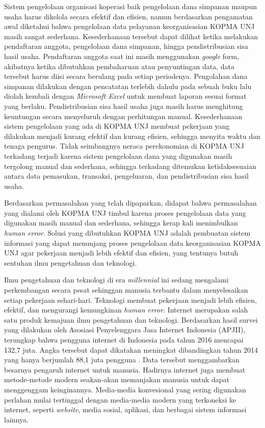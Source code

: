 Sistem pengelolaan organisasi koperasi baik pengelolaan dana simpanan maupun usaha harus dikelola secara efektif dan efisien, namun berdasarkan pengamatan awal diketahui bahwa pengelolaan data pelayanan keorganisasian KOPMA UNJ masih sangat sederhana. Kesederhanaan tersebut dapat dilihat ketika melakukan pendaftaran anggota, pengelolaan dana simpanan, hingga pendistribusian sisa hasil usaha. Pendaftaran anggota saat ini masih menggunakan \emph{google} form, akibatnya ketika dibutuhkan pembaharuan atau penyuntingan data, data tersebut harus diisi secara berulang pada setiap periodenya. Pengolahan dana simpanan dilakukan dengan pencatatan terlebih dahulu pada sebuah buku lalu diolah kembali dengan \emph{Microsoft Excel} untuk membuat laporan sesuai format yang berlaku. Pendistribusian sisa hasil usaha juga masih harus menghitung keuntungan secara menyeluruh dengan perhitungan manual. Kesederhanaan sistem pengelolaan yang ada di KOPMA UNJ membuat pekerjaan yang dilakukan menjadi kurang efektif dan kurang efisien, sehingga menyita waktu dan tenaga pengurus. Tidak seimbangnya neraca perekonomian di KOPMA UNJ terkadang terjadi karena sistem pengelolaan dana yang digunakan masih tergolong manual dan sederhana, sehingga terkadang ditemukan ketidaksesuaian antara data pemasukan, transaksi, pengeluaran, dan pendistribusian sisa hasil usaha. 

Berdasarkan permasalahan yang telah dipaparkan, didapat bahwa permasalahan yang dialami oleh KOPMA UNJ timbul karena proses pengelolaan data yang digunakan masih manual dan sederhana, sehingga kerap kali menimbulkan \emph{human error}. Solusi yang dibutuhkan KOPMA UNJ adalah pembuatan sistem informasi yang dapat menunjang proses pengelolaan data keorganisasian KOPMA UNJ agar pekerjaan menjadi lebih efektif dan efisien, yang tentunya butuh sentuhan ilmu pengetahuan dan teknologi. 

Ilmu pengetahuan dan teknologi di era \emph{millennial} ini sedang mengalami perkembangan secara pesat sehinggan manusia terbantu dalam menyelesaikan setiap pekerjaan sehari-hari. Teknologi membuat pekerjaan menjadi lebih efisien, efektif, dan mengurangi kemungkinan \emph{human error}. Internet merupakan salah satu produk kemajuan ilmu pengetahuan dan teknologi. Berdasarkan hasil survei yang dilakukan oleh Asosiasi Penyelenggara Jasa Internet Indonesia (APJII), terungkap bahwa pengguna internet di Indonesia pada tahun 2016 mencapai 132,7 juta. Angka tersebut dapat dikatakan meningkat dibandingkan tahun 2014 yang hanya berjumlah 88,1 juta pengguna \cite{apjii}. Data tersebut menggambarkan besarnya pengaruh internet untuk manusia. Hadirnya internet juga membuat metode-metode modern seakan-akan memanjakan manusia untuk dapat menggenggam keinginannya. Media-media konvesional yang sering digunakan perlahan mulai tertinggal dengan media-media modern yang terkoneksi ke internet, seperti \emph{website}, media sosial, aplikasi, dan berbagai sistem informasi lainnya.

